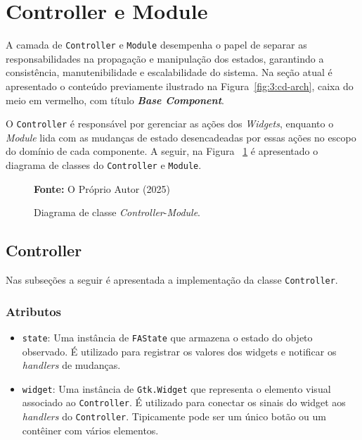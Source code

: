 \section{Controller e Module}
\label{sec:3:controller-module}

A camada de \texttt{Controller} e \texttt{Module} desempenha o papel de separar as responsabilidades na propagação e manipulação dos estados, garantindo a consistência, manutenibilidade e escalabilidade do sistema. Na seção atual é apresentado o conteúdo previamente ilustrado na Figura~\ref{fig:3:cd-arch}, caixa do meio em vermelho, com título \textbf{\textit{Base Component}}.

O \texttt{Controller} é responsável por gerenciar as ações dos \textit{Widgets}, enquanto o \textit{Module} lida com as mudanças de estado desencadeadas por essas ações no escopo do domínio de cada componente. A seguir, na Figura ~\ref{fig:3:cd-controller-module} é apresentado o diagrama de classes do \texttt{Controller} e \texttt{Module}.

\begin{figure}[h!]
    \centerline{}
    \caption{Diagrama de classe \textit{Controller}-\textit{Module}.}
    \centerline{\textbf{Fonte:} O Próprio Autor (2025)}
    \label{fig:3:cd-controller-module}
\end{figure}

\newpage

\subsection{Controller}
\label{subsec:3:controller}

Nas subseções a seguir é apresentada a implementação da classe \texttt{Controller}.

\subsubsection{Atributos}
\label{subsec:3.3.1:attributes}

\begin{itemize}
    \item \texttt{state}: Uma instância de \texttt{FAState} que armazena o estado do objeto observado. É utilizado para registrar os valores dos widgets e notificar os \textit{handlers} de mudanças.

    \item \texttt{widget}: Uma instância de \texttt{Gtk.Widget} que representa o elemento visual associado ao \texttt{Controller}. É utilizado para conectar os sinais do widget aos \textit{handlers} do \texttt{Controller}. Tipicamente pode ser um único botão ou um contêiner com vários elementos.
\end{itemize}

